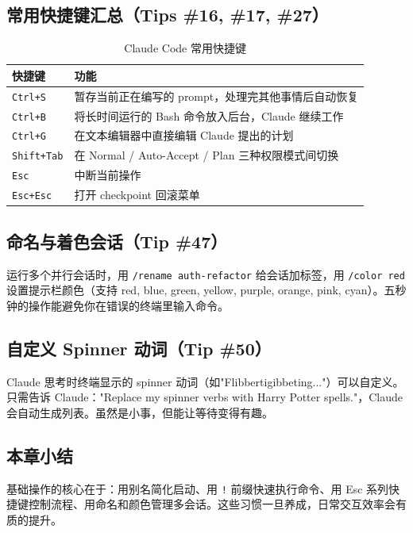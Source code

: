 \documentclass[a4paper]{article}
\begin{document}
\subsection{常用快捷键汇总（Tips \#16, \#17, \#27）}

\begin{table}[H]
\centering
\begin{tabular}{lp{9cm}}
\toprule
\textbf{快捷键} & \textbf{功能} \\
\midrule
\texttt{Ctrl+S} & 暂存当前正在编写的 prompt，处理完其他事情后自动恢复 \\
\texttt{Ctrl+B} & 将长时间运行的 Bash 命令放入后台，Claude 继续工作 \\
\texttt{Ctrl+G} & 在文本编辑器中直接编辑 Claude 提出的计划 \\
\texttt{Shift+Tab} & 在 Normal / Auto-Accept / Plan 三种权限模式间切换 \\
\texttt{Esc} & 中断当前操作 \\
\texttt{Esc+Esc} & 打开 checkpoint 回滚菜单 \\
\bottomrule
\end{tabular}
\caption{Claude Code 常用快捷键}
\end{table}

\subsection{命名与着色会话（Tip \#47）}

运行多个并行会话时，用 \texttt{/rename auth-refactor} 给会话加标签，用 \texttt{/color red} 设置提示栏颜色（支持 red, blue, green, yellow, purple, orange, pink, cyan）。五秒钟的操作能避免你在错误的终端里输入命令。

\subsection{自定义 Spinner 动词（Tip \#50）}

Claude 思考时终端显示的 spinner 动词（如"Flibbertigibbeting..."）可以自定义。只需告诉 Claude："Replace my spinner verbs with Harry Potter spells."，Claude 会自动生成列表。虽然是小事，但能让等待变得有趣。

\subsection{本章小结}

基础操作的核心在于：用别名简化启动、用 \texttt{!} 前缀快速执行命令、用 Esc 系列快捷键控制流程、用命名和颜色管理多会话。这些习惯一旦养成，日常交互效率会有质的提升。
\end{document}

